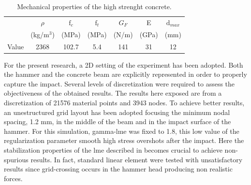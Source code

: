 \message{ !name(2020_EFM_MPM_Eigensoftening.tex)}\documentclass[preprint,12pt,a4paper]{elsarticle}
\begin{document}
\begin{table}
  \centering
  \begin{tabular}[]{c c c c c c c}
    \hline
      &   $\rho$   & $\text{f}_c$ & $\text{f}_t$ & $G_F$ &   E   & $\text{d}_{max}$ \\
      & (kg/m$^3$) &     (MPa)    &     (MPa)    & (N/m) & (GPa) & (mm) \\
    \hline
Value &    2368    &     102.7    &      5.4     &  141  &   31  &  12 \\
    \hline
  \end{tabular}
  \caption[Mechanical properties of thje concrete]{Mechanical
    properties of the high strenght concrete.}
  \label{tab:concrete-properties}
\end{table}
For the present research, a 2D setting of the experiment has been
adopted. Both the hammer and the concrete beam are explicitly
represented in order to properly capture the impact. Several levels of
discretization were required to assess the objectiveness of the
obtained results. The results here exposed are from a discretization
of 21576 material points and 3943 nodes. To achieve better results, an
unestructured grid layout has been adopted focusing the minimum nodal
spacing, 1.2 mm, in the middle of the beam and in the impact surface
of the hammer. For this simulation, \gls{gamma-lme} was fixed to
1.8, this low value of the regularization parameter smooth high stress
overshots after the impact. Here the stabilization properties of the \acrshort{lme}
described in \cite{Molinos2020} becomes crucial to achieve
non-spurious results. In fact, standard linear element were tested
with unsatisfactory results since grid-crossing occurs in the hammer
head producing non realistic forces.\\
\end{document}
